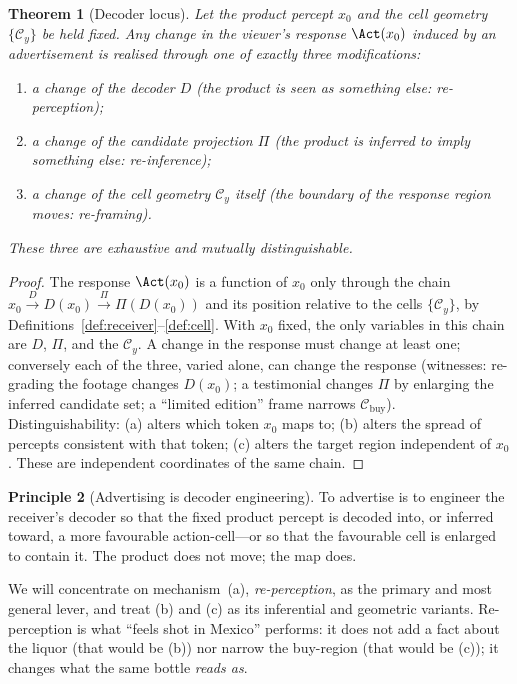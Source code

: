 \documentclass[twocolumn,11pt,a4paper]{article}
\theoremstyle{adv}
\newtheorem{theorem}{Theorem}[section]
\theoremstyle{definition}
\newtheorem{principle}[theorem]{Principle}
\theoremstyle{remark}
\newcommand{\Cell}{\mathcal{C}}        %
\newcommand{\Dec}{D}                   %
\newcommand{\Proj}{\Pi}                %
\begin{document}
\begin{theorem}[Decoder locus]
\label{thm:decoderlocus}
Let the product percept $x_0$ and the cell geometry $\{\Cell_y\}$ be held
fixed. Any change in the viewer's response $\Act(x_0)$ induced by an
advertisement is realised through one of exactly three modifications:
\begin{enumerate}[label=(\alph*),leftmargin=1.8em,itemsep=1pt]
\item a change of the decoder $\Dec$ (the product is \emph{seen as}
  something else: re-perception);
\item a change of the candidate projection $\Proj$ (the product is
  \emph{inferred to imply} something else: re-inference);
\item a change of the cell geometry $\Cell_y$ itself (the boundary of the
  response region moves: re-framing).
\end{enumerate}
These three are exhaustive and mutually distinguishable.
\end{theorem}

\begin{proof}
The response $\Act(x_0)$ is a function of $x_0$ only through the chain
$x_0 \xrightarrow{\Dec} \Dec(x_0)\xrightarrow{\Proj}\Proj(\Dec(x_0))$ and
its position relative to the cells $\{\Cell_y\}$, by
Definitions~\ref{def:receiver}--\ref{def:cell}. With $x_0$ fixed, the only
variables in this chain are $\Dec$, $\Proj$, and the $\Cell_y$. A change in
the response must change at least one; conversely each of the three, varied
alone, can change the response (witnesses: re-grading the footage changes
$\Dec(x_0)$; a testimonial changes $\Proj$ by enlarging the inferred
candidate set; a ``limited edition'' frame narrows $\Cell_{\text{buy}}$).
Distinguishability: (a) alters which token $x_0$ maps to; (b) alters the
spread of percepts consistent with that token; (c) alters the target
region independent of $x_0$. These are independent coordinates of the same
chain.
\end{proof}

\begin{principle}[Advertising is decoder engineering]
\label{prin:engineering}
To advertise is to engineer the receiver's decoder so that the fixed
product percept is decoded into, or inferred toward, a more favourable
action-cell---or so that the favourable cell is enlarged to contain it.
The product does not move; the map does.
\end{principle}

We will concentrate on mechanism~(a), \emph{re-perception}, as the primary
and most general lever, and treat (b) and (c) as its inferential and
geometric variants. Re-perception is what ``feels shot in Mexico''
performs: it does not add a fact about the liquor (that would be (b)) nor
narrow the buy-region (that would be (c)); it changes what the same bottle
\emph{reads as}.
\end{document}
